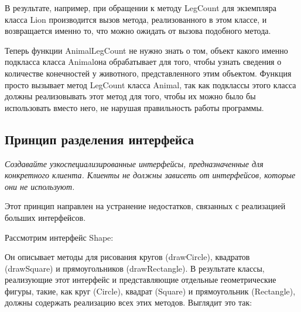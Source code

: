 \documentclass[a4paper]{article}
\begin{document}
В результате, например, при обращении к методу LegCount для экземпляра класса Lion производится вызов метода, реализованного в этом классе, и возвращается именно то, что можно ожидать от вызова подобного метода.

Теперь функции AnimalLegCount не нужно знать о том, объект какого именно подкласса класса Animalона обрабатывает для того, чтобы узнать сведения о количестве конечностей у животного, представленного этим объектом. Функция просто вызывает метод LegCount класса Animal, так как подклассы этого класса должны реализовывать этот метод для того, чтобы их можно было бы использовать вместо него, не нарушая правильность работы программы.

\subsection{Принцип разделения интерфейса}

\textit{Создавайте узкоспециализированные интерфейсы, предназначенные для конкретного клиента. Клиенты не должны зависеть от интерфейсов, которые они не используют.}

Этот принцип направлен на устранение недостатков, связанных с реализацией больших интерфейсов.

Рассмотрим интерфейс Shape:

\begin{figure}[h]
\end{figure}


\newpage
Он описывает методы для рисования кругов (drawCircle), квадратов (drawSquare) и прямоугольников (drawRectangle). В результате классы, реализующие этот интерфейс и представляющие отдельные геометрические фигуры, такие, как круг (Circle), квадрат (Square) и прямоугольник (Rectangle), должны содержать реализацию всех этих методов. Выглядит это так:
\end{document}
